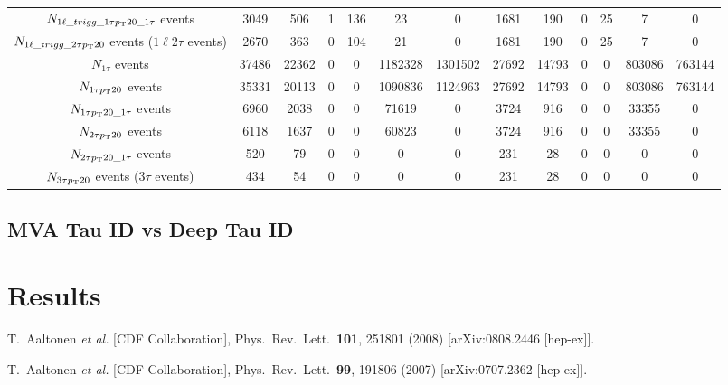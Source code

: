 \documentclass[letterpaper,12pt]{article}
\begin{document}
\begin{table}
{\begin{tabular}{c|cccccc|cccccc}
      $N_{1\ell\_trigg\_1\tau p_{\mathrm{T}}20\_1\tau}$ events & 3049 & 506 & 1 & 136 & 23 & 0 & 1681 & 190 & 0 & 25 & 7 & 0\\
      \rowcolor{highlight}$N_{1\ell\_trigg\_2\tau p_{\mathrm{T}}20}$ events ($1\ell2\tau$ events) & 2670 & 363 & 0 & 104 & 21 & 0 & 1681 & 190 & 0 & 25 & 7 & 0\\
      $N_{1\tau}$ events & 37486 & 22362 & 0 & 0 & 1182328 & 1301502 & 27692 & 14793 & 0 & 0 & 803086 & 763144\\
      $N_{1\tau p_{\mathrm{T}}20}$ events & 35331 & 20113 & 0 & 0 & 1090836 & 1124963 & 27692 & 14793 & 0 & 0 & 803086 & 763144\\
      $N_{1\tau p_{\mathrm{T}}20\_1\tau}$ events & 6960 & 2038 & 0 & 0 & 71619 & 0 & 3724 & 916 & 0 & 0 & 33355 & 0\\
      $N_{2\tau p_{\mathrm{T}}20}$ events & 6118 & 1637 & 0 & 0 & 60823 & 0 & 3724 & 916 & 0 & 0 & 33355 & 0\\
      $N_{2\tau p_{\mathrm{T}}20\_1\tau}$ events & 520 & 79 & 0 & 0 & 0 & 0 & 231 & 28 & 0 & 0 & 0 & 0\\
      \rowcolor{highlight} $N_{3\tau p_{\mathrm{T}}20}$ events ($3\tau$ events) & 434 & 54 & 0 & 0 & 0 & 0 & 231 & 28 & 0 & 0 & 0 & 0\\
      \hline
      \hline	
    \end{tabular}%
  }
  \label{tab:crsummary}
\end{table}

\subsection{MVA Tau ID vs Deep Tau ID}
\label{sec:mvadeep}

\section{Results}
\label{sec:results}


\begin{thebibliography}{10}

  T.~Aaltonen {\it et al.}  [CDF Collaboration],
  Phys.\ Rev.\ Lett.\  {\bf 101}, 251801 (2008)
  [arXiv:0808.2446 [hep-ex]].

  T.~Aaltonen {\it et al.}  [CDF Collaboration],
  Phys.\ Rev.\ Lett.\  {\bf 99}, 191806 (2007)
  [arXiv:0707.2362 [hep-ex]].



\end{thebibliography}
\end{document}
